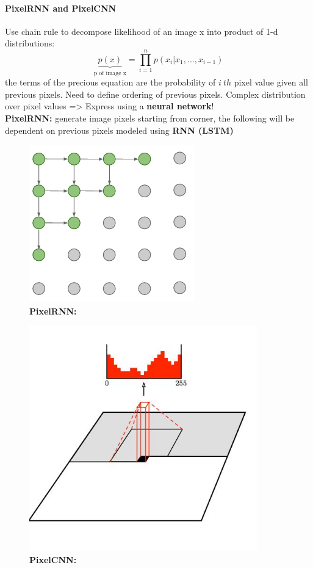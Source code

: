 \documentclass[11pt]{article}
\begin{document}
\paragraph{PixelRNN and PixelCNN}
Use chain rule to decompose likelihood of an image x into product of 1-d distributions:
\begin{equation}
    \underbrace{p(x)}_\text{p of image x}=\prod_{i=1}^{n} p( x_i|x_1,...,x_{i-1})
\end{equation}{}
the terms of the precious equation are the probability of $i\  th$  pixel value given all previous pixels. Need to define ordering of previous pixels. Complex distribution over pixel values => Express using a \textbf{neural network}!\\
\textbf{PixelRNN:} generate image pixels starting from corner, the following will be dependent on previous pixels modeled using \textbf{RNN (LSTM)}\\
\begin{minipage}{0.5\textwidth}
\begin{figure} [H]
\centering 
\includegraphics[scale=0.7]{L1212.pdf}
\caption{ \textbf{PixelRNN:} }
\label{fig:L1212}
\end{figure}
\end{minipage}
\begin{minipage}{0.5\textwidth}
\begin{figure} [H]
\centering 
\includegraphics[scale=0.7]{L1213.pdf}
\caption{\textbf{PixelCNN:} }
\label{fig:L1213}
\end{figure}
\end{minipage}
\end{document}
